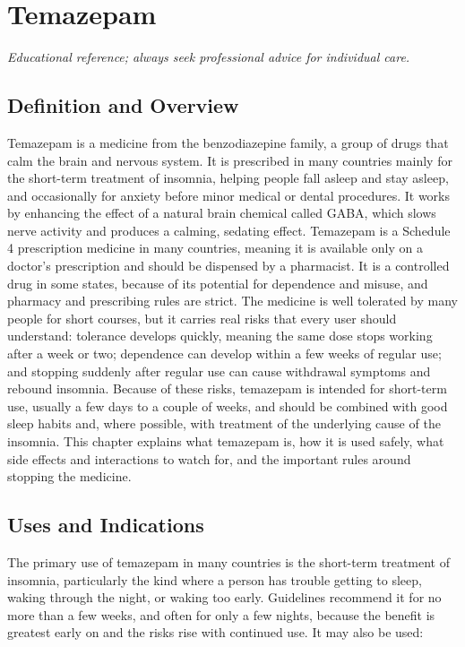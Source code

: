 \chapter{Temazepam}

\medskip
\noindent\textit{Educational reference; always seek professional advice for individual care.}

\section*{Definition and Overview}
Temazepam is a medicine from the benzodiazepine family, a group of drugs that calm the brain and nervous system. It is prescribed in many countries mainly for the short-term treatment of insomnia, helping people fall asleep and stay asleep, and occasionally for anxiety before minor medical or dental procedures. It works by enhancing the effect of a natural brain chemical called GABA, which slows nerve activity and produces a calming, sedating effect. Temazepam is a Schedule 4 prescription medicine in many countries, meaning it is available only on a doctor's prescription and should be dispensed by a pharmacist. It is a controlled drug in some states, because of its potential for dependence and misuse, and pharmacy and prescribing rules are strict. The medicine is well tolerated by many people for short courses, but it carries real risks that every user should understand: tolerance develops quickly, meaning the same dose stops working after a week or two; dependence can develop within a few weeks of regular use; and stopping suddenly after regular use can cause withdrawal symptoms and rebound insomnia. Because of these risks, temazepam is intended for short-term use, usually a few days to a couple of weeks, and should be combined with good sleep habits and, where possible, with treatment of the underlying cause of the insomnia. This chapter explains what temazepam is, how it is used safely, what side effects and interactions to watch for, and the important rules around stopping the medicine.

\section*{Uses and Indications}
The primary use of temazepam in many countries is the short-term treatment of insomnia, particularly the kind where a person has trouble getting to sleep, waking through the night, or waking too early. Guidelines recommend it for no more than a few weeks, and often for only a few nights, because the benefit is greatest early on and the risks rise with continued use. It may also be used:

